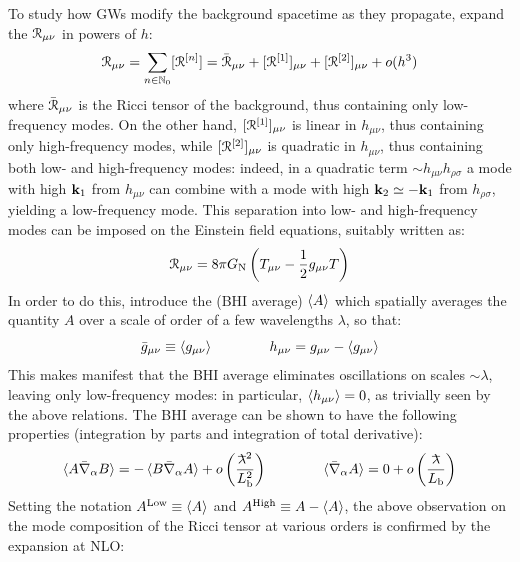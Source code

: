 To study how GWs modify the background spacetime as they propagate, expand the $ \EuScript{R}_{\mu \nu} $ in powers of $ h $:
\begin{equation*}
  \EuScript{R}_{\mu \nu} = \sum_{n \in \mathbb{N}_0} [\EuScript{R}^{[n]}] = \bar{\EuScript{R}}_{\mu \nu} + [\EuScript{R}^{[1]}]_{\mu \nu} + [\EuScript{R}^{[2]}]_{\mu \nu} + o(h^3)
\end{equation*}
where $ \bar{\EuScript{R}}_{\mu \nu} $ is the Ricci tensor of the background, thus containing only low-frequency modes. On the other hand, $ [\EuScript{R}^{[1]}]_{\mu \nu} $ is linear in $ h_{\mu \nu} $, thus containing only high-frequency modes, while $ [\EuScript{R}^{[2]}]_{\mu \nu} $ is quadratic in $ h_{\mu \nu} $, thus containing both low- and high-frequency modes: indeed, in a quadratic term $ \sim h_{\mu \nu} h_{\rho \sigma} $ a mode with high $ \mathbf{k}_1 $ from $ h_{\mu \nu} $ can combine with a mode with high $ \mathbf{k}_2 \simeq - \mathbf{k}_1 $ from $ h_{\rho \sigma} $, yielding a low-frequency mode. This separation into low- and high-frequency modes can be imposed on the Einstein field equations, suitably written as:
\begin{equation*}
  \EuScript{R}_{\mu \nu} = 8\pi G_\text{N} \left( T_{\mu \nu} - \frac{1}{2} g_{\mu \nu} T \right)
\end{equation*}
In order to do this, introduce the  (BHI average) $ \braket{A} $ which spatially averages the quantity $ A $ over a scale of order of a few wavelengths $ \lambda $, so that:
\begin{equation*}
  \bar{g}_{\mu \nu} \equiv \braket{g_{\mu \nu}}
  \qquad \qquad
  h_{\mu \nu} = g_{\mu \nu} - \braket{g_{\mu \nu}}
\end{equation*}
This makes manifest that the BHI average eliminates oscillations on scales $ \sim \lambda $, leaving only low-frequency modes: in particular, $ \braket{h_{\mu \nu}} = 0 $, as trivially seen by the above relations. The BHI average can be shown to have the following properties (integration by parts and integration of total derivative):
\begin{equation}
  \braket{A \bar{\na}_\alpha B} = - \braket{B \bar{\na}_\alpha A} + \smo \left( \frac{\lbar^2}{L_\text{b}^2} \right)
  \qquad \qquad
  \braket{\bar{\na}_\alpha A} = 0 + \smo \left( \frac{\lbar}{L_\text{b}} \right)
  \label{eq:bhi-prop}
\end{equation}
Setting the notation $ A^\text{Low} \equiv \braket{A} $ and $ A^\text{High} \equiv A - \braket{A} $, the above observation on the mode composition of the Ricci tensor at various orders is confirmed by the expansion at NLO:

